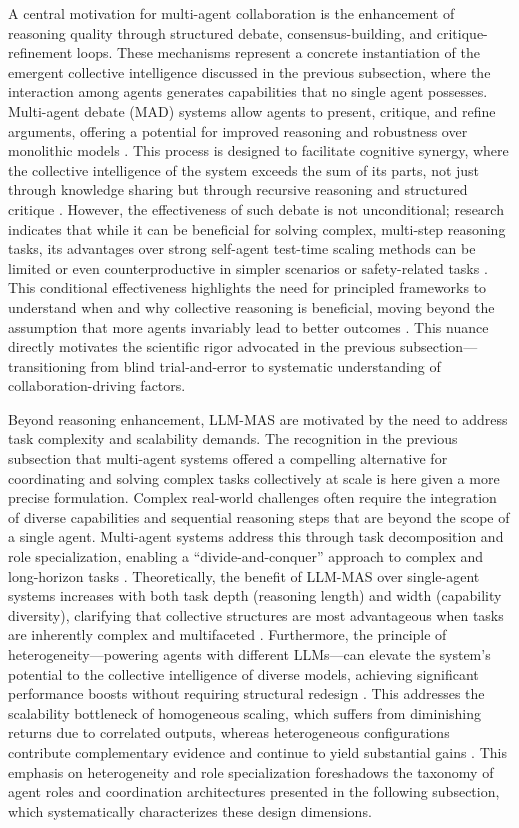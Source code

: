 \documentclass[11pt]{article}
\begin{document}
A central motivation for multi-agent collaboration is the enhancement of reasoning quality through structured debate, consensus-building, and critique-refinement loops. These mechanisms represent a concrete instantiation of the emergent collective intelligence discussed in the previous subsection, where the interaction among agents generates capabilities that no single agent possesses. Multi-agent debate (MAD) systems allow agents to present, critique, and refine arguments, offering a potential for improved reasoning and robustness over monolithic models \cite{ref26}. This process is designed to facilitate cognitive synergy, where the collective intelligence of the system exceeds the sum of its parts, not just through knowledge sharing but through recursive reasoning and structured critique \cite{ref25}. However, the effectiveness of such debate is not unconditional; research indicates that while it can be beneficial for solving complex, multi-step reasoning tasks, its advantages over strong self-agent test-time scaling methods can be limited or even counterproductive in simpler scenarios or safety-related tasks \cite{ref26,ref27}. This conditional effectiveness highlights the need for principled frameworks to understand when and why collective reasoning is beneficial, moving beyond the assumption that more agents invariably lead to better outcomes \cite{ref28,ref27}. This nuance directly motivates the scientific rigor advocated in the previous subsection---transitioning from blind trial-and-error to systematic understanding of collaboration-driving factors.

Beyond reasoning enhancement, LLM-MAS are motivated by the need to address task complexity and scalability demands. The recognition in the previous subsection that multi-agent systems offered a compelling alternative for coordinating and solving complex tasks collectively at scale is here given a more precise formulation. Complex real-world challenges often require the integration of diverse capabilities and sequential reasoning steps that are beyond the scope of a single agent. Multi-agent systems address this through task decomposition and role specialization, enabling a ``divide-and-conquer'' approach to complex and long-horizon tasks \cite{ref29}. Theoretically, the benefit of LLM-MAS over single-agent systems increases with both task depth (reasoning length) and width (capability diversity), clarifying that collective structures are most advantageous when tasks are inherently complex and multifaceted \cite{ref27}. Furthermore, the principle of heterogeneity---powering agents with different LLMs---can elevate the system's potential to the collective intelligence of diverse models, achieving significant performance boosts without requiring structural redesign \cite{ref30}. This addresses the scalability bottleneck of homogeneous scaling, which suffers from diminishing returns due to correlated outputs, whereas heterogeneous configurations contribute complementary evidence and continue to yield substantial gains \cite{ref31}. This emphasis on heterogeneity and role specialization foreshadows the taxonomy of agent roles and coordination architectures presented in the following subsection, which systematically characterizes these design dimensions.
\end{document}
